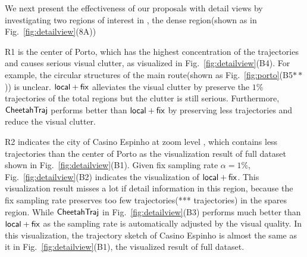 We next present the effectiveness of our proposals with detail views by investigating two regions of interest in \pt{}, the dense region(shown as in Fig.~\ref{fig:detailview}(8A))

R1 is the center of Porto, which has the highest concentration of the trajectories and causes serious visual clutter, as visualized in Fig.~\ref{fig:detailview}(B4).
For example, the circular structures of the main route(shown as Fig.~\ref{fig:porto}(B5$**$)) is unclear.
$\mathsf{local+fix}$ alleviates the visual clutter by preserve the $1\%$ trajectories of the total regions but the clutter is still serious. Furthermore, $\mathsf{CheetahTraj}$ performs better than $\mathsf{local+fix}$ by preserving less trajectories and reduce the visual clutter. 


R2 indicates the city of Casino Espinho at zoom level \QM{**}, which contains less trajectories than the center of Porto as the visualization result of full dataset shown in Fig.~\ref{fig:detailview}(B1). 
Given fix sampling rate $\alpha=1\%$, Fig.~\ref{fig:detailview}(B2) indicates the visualization of $\mathsf{local+fix}$. This visualization result misses a lot if detail information in this region, because the fix sampling rate preserves too few trajectories(*** trajectories) in the spares region.
While $\mathsf{CheetahTraj}$ in Fig.~\ref{fig:detailview}(B3) performs much better than $\mathsf{local+fix}$ as the sampling rate is automatically adjusted by the visual quality. In this visualization, the trajectory sketch of Casino Espinho is almost the same as it in Fig.~\ref{fig:detailview}(B1), the visualized result of full dataset.


